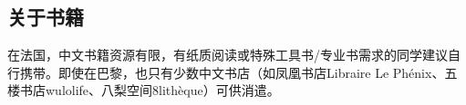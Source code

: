 \subsection{关于书籍}

在法国，中文书籍资源有限，有纸质阅读或特殊工具书/专业书需求的同学建议自行携带。即使在巴黎，也只有少数中文书店（如凤凰书店Libraire Le Phénix、五楼书店wulolife、八梨空间8lithèque）可供消遣。
